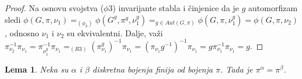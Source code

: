 \documentclass[12pt,oneside]{memoir}
\newtheorem{lemma}{Lema}
\theoremstyle{definition}
\begin{document}
  \begin{proof}
	  Na osnovu svojstva ($\phi3$) invarijante stabla i činjenice da je $g$
	  automorfizam sledi $\phi(G, \pi, \nu_1) =_{(\phi_3)} \phi(G^g, \pi^g,
	  \nu_1^g) =_{g \in Aut(G, \pi)} \phi(G, \pi, \nu_1^g) = \phi(G, \pi,
	  \nu_2)$, odnosno $\nu_1$ i $\nu_2$ su ekvivalentni. Dalje, važi
	  $\pi_{\nu_2}^{-1}\pi_{\nu_1} = \pi_{\nu_1^g}^{-1}\pi_{\nu_1} =_{(R3)}
	  (\pi_{\nu_1}^g)^{-1}\pi_{\nu_1} = (\pi_{\nu_1} g^{-1})^{-1} \pi_{\nu_1} = g
	  \pi_{\nu_1}^{-1} \pi_{\nu_1} = g$.
  \end{proof}

  \begin{lemma}
	  Neka su $\alpha$ i $\beta$ diskretna bojenja finija od bojenja $\pi$.
	  Tada je $\pi^\alpha = \pi^\beta$.
  \end{lemma}
\end{document}
